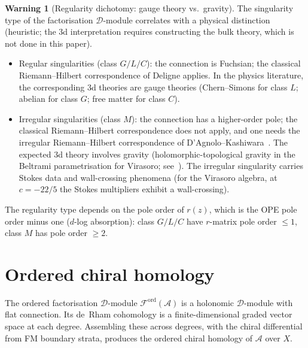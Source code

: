 \documentclass[11pt,reqno]{amsart}
\theoremstyle{definition}
\newtheorem{warning}[theorem]{Warning}
\theoremstyle{remark}
\newcommand{\cA}{\mathcal{A}}
\newcommand{\cD}{\mathcal{D}}
\newcommand{\cF}{\mathcal{F}}
\numberwithin{equation}{section}
\begin{document}
\begin{warning}[Regularity dichotomy: gauge theory vs.\ gravity]
\label{warn:regularity}
The singularity type of the factorisation $\cD$-module
correlates with a physical distinction
\textup{(}heuristic; the $3$d interpretation requires
constructing the bulk theory, which is not done in this
paper\textup{)}.
\begin{itemize}
\item \textup{Regular singularities \textup{(}class $G/L/C$\textup{)}:}
  the connection is Fuchsian; the classical
  Riemann--Hilbert correspondence of Deligne applies.
  In the physics literature, the corresponding $3$d
  theories are gauge theories
  \textup{(}Chern--Simons for class $L$; abelian for
  class $G$; free matter for class $C$\textup{)}.
\item \textup{Irregular singularities
  \textup{(}class $M$\textup{)}:}
  the connection has a higher-order pole; the classical
  Riemann--Hilbert correspondence does not apply, and one
  needs the irregular Riemann--Hilbert
  correspondence of D'Agnolo--Kashiwara~\cite{DAgnoloKashiwara16}.
  The expected $3$d theory involves gravity
  \textup{(}holomorphic-topological gravity in the
  Beltrami parametrisation for Virasoro;
  see~\cite{CG17}\textup{)}.
  The irregular singularity carries Stokes data and
  wall-crossing phenomena \textup{(}for the Virasoro
  algebra, at $c = -22/5$ the Stokes multipliers
  exhibit a wall-crossing\textup{)}.
\end{itemize}
The regularity type depends on the pole order of $r(z)$,
which is the OPE pole order minus one \textup{(}$d$-log
absorption\textup{)}: class $G/L/C$ have $r$-matrix pole
order $\leq 1$, class $M$ has pole order $\geq 2$.
\end{warning}

\section{Ordered chiral homology}
\label{sec:ord-ch-hom}

The ordered factorisation $\cD$-module
$\cF^{\mathrm{ord}}(\cA)$ is a holonomic $\cD$-module with
flat connection. Its de~Rham cohomology is a
finite-dimensional graded vector space at each degree.
Assembling these across degrees, with the chiral differential
from FM boundary strata, produces the ordered chiral
homology of $\cA$ over $X$.

\end{document}

